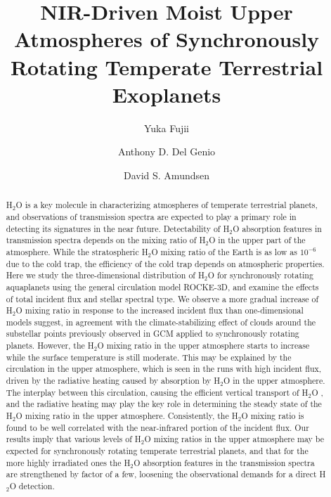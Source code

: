 \documentclass[11pt,numberedappendix,twocolappendix,]{emulateapj}
\def\water{H$_2$O }
\newcommand{\dsa}[1]{{\color{blue}#1}}
\begin{document}
\title{NIR-Driven Moist Upper Atmospheres of Synchronously Rotating Temperate Terrestrial Exoplanets}
\author{Yuka Fujii}
\author{Anthony D. Del Genio}
\author{David S. Amundsen}

\begin{abstract}

\water is a key molecule in characterizing atmospheres of temperate terrestrial planets, and observations of transmission spectra are expected to play a primary role in detecting its signatures in the near future. 
%
Detectability of \water absorption features in transmission spectra depends on the mixing ratio of \water in the upper part of the atmosphere. 
%
While the stratospheric \water mixing ratio of the Earth is as low as $10^{-6}$ due to the cold trap, the efficiency of the cold trap depends on atmospheric properties. 
%
Here we study the three-dimensional distribution of \water for synchronously rotating aquaplanets using the general circulation model ROCKE-3D, and examine the effects of total incident flux and stellar spectral type.  
%
We observe a more gradual increase of \water mixing ratio in response to the increased incident flux than one-dimensional models suggest, in \dsa{agreement} with the climate-stabilizing effect of clouds around the substellar points previously observed in GCM applied to synchronously rotating planets. 
%
However, the \water mixing ratio in the upper atmosphere starts to increase  while the surface temperature is still moderate. 
%
This may be explained by the circulation in the upper atmosphere, which is seen in the runs with high incident flux, driven by the radiative heating caused by absorption by \water in the upper atmosphere. 
%
The interplay between this circulation, causing the efficient vertical transport of \water, and the radiative heating may play the key role in determining the steady state of the \water mixing ratio in the upper atmosphere. 
%
Consistently, the \water mixing ratio is found to be well correlated with the near-infrared portion of the incident flux. 
%
Our results imply that various levels of \water mixing ratios in the upper atmosphere may be expected for synchronously rotating temperate terrestrial planets, and that for the more highly irradiated ones the \water absorption features in the transmission spectra are strengthened by factor of a few, loosening the observational demands for a direct \water detection. 
%
\end{abstract}
\end{document}
